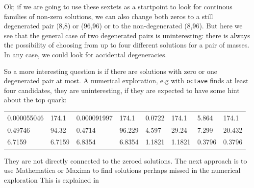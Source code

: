 \documentclass{article}
\begin{document}
Ok; if we are going to use these sextets as a startpoint to look
for continous families of non-zero solutions, we can also change 
both zeros to a still degenerated pair (8,8) or
(96,96) or to the non-degenerated (8,96). But here we see that
the general case of two degenerated pairs is uninteresting: 
there is always the possibility of choosing from up to four 
different solutions for a pair of masses. In any case, we could
look for accidental degeneracies.

So a more interesting question 
is if there are solutions with zero or one degenerated pair at most.
A numerical exploration, e.g with {\tt octave} finds at least four candidates,
they are uninteresting, if they are expected to have some hint about
the top quark:
                      
%                      
                      
                        

\begin{center}
\begin{tabular}{|ll|ll|ll|ll|}
0.000055046 &  174.1  & 0.000091997  & 174.1  & 0.0722 & 174.1& 5.864 & 174.1\\
 0.49746& 94.32  & 0.4714 & 96.229  & 4.597 &  29.24 & 7.299 & 20.432\\
6.7159 & 6.7159 & 6.8354 & 6.8354 & 1.1821 & 1.1821 & 0.3796& 0.3796 \\
\hline
\end{tabular}
\end{center}

 
 They are not directly connected to the zeroed solutions.
 The next approach is to use Mathematica or Maxima to find
 solutions perhaps missed in the numerical exploration
  This is explained in
 
\end{document}
